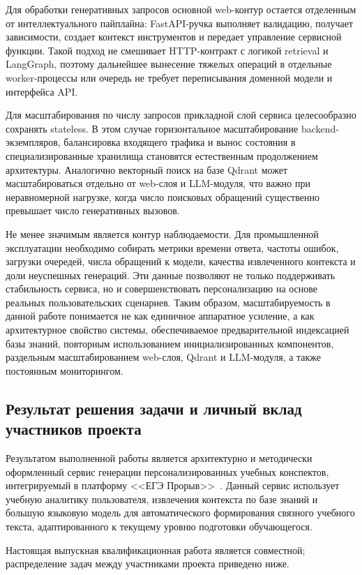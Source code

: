 \documentclass[a4paper,12pt]{extarticle}
\begin{document}
Для обработки генеративных запросов основной web-контур остается отделенным от
интеллектуального пайплайна: FastAPI-ручка выполняет валидацию, получает зависимости,
создает контекст инструментов и передает управление сервисной функции. Такой подход
не смешивает HTTP-контракт с логикой retrieval и LangGraph, поэтому дальнейшее
вынесение тяжелых операций в отдельные worker-процессы или очередь не требует
переписывания доменной модели и интерфейса API.

Для масштабирования по числу запросов прикладной слой сервиса целесообразно 
сохранять stateless. В этом случае горизонтальное масштабирование backend-экземпляров, 
балансировка входящего трафика и вынос состояния в специализированные хранилища становятся 
естественным продолжением архитектуры. Аналогично векторный поиск на базе Qdrant может 
масштабироваться отдельно от web-слоя и LLM-модуля, что важно при неравномерной нагрузке, 
когда число поисковых обращений существенно превышает число генеративных вызовов.

Не менее значимым является контур наблюдаемости. Для промышленной эксплуатации необходимо 
собирать метрики времени ответа, частоты ошибок, загрузки очередей, числа обращений к модели, 
качества извлеченного контекста и доли неуспешных генераций. Эти данные позволяют не только поддерживать 
стабильность сервиса, но и совершенствовать персонализацию на основе реальных 
пользовательских сценариев. Таким образом, масштабируемость в данной работе понимается не
как единичное аппаратное усиление, а как архитектурное свойство системы, обеспечиваемое
предварительной индексацией базы знаний, повторным использованием инициализированных
компонентов, раздельным масштабированием web-слоя, Qdrant и LLM-модуля, а также
постоянным мониторингом.

\subsection{Результат решения задачи и личный вклад участников проекта}

Результатом выполненной работы является архитектурно и методически оформленный сервис 
генерации персонализированных учебных конспектов, интегрируемый в платформу <<ЕГЭ Прорыв>>~\cite{exambreakout2026}. 
Данный сервис использует учебную аналитику пользователя, 
извлечения контекста по базе знаний и большую языковую модель для автоматического формирования 
связного учебного текста, адаптированного к текущему уровню подготовки обучающегося.

Настоящая выпускная квалификационная работа является совместной;
распределение задач между участниками проекта приведено ниже.
\end{document}
